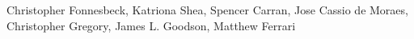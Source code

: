 Christopher Fonnesbeck, Katriona Shea, Spencer Carran, Jose Cassio de Moraes, Christopher Gregory, James L. Goodson, Matthew Ferrari